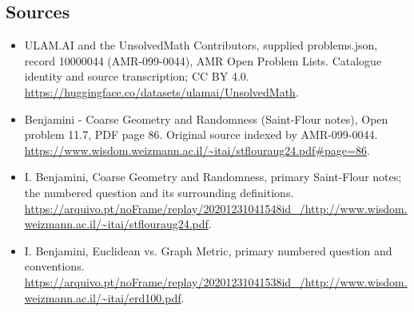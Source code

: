 \documentclass[11pt,a4paper]{article}
\begin{document}
\subsection{Sources}
\begin{itemize}
\item[S1] ULAM.AI and the UnsolvedMath Contributors, supplied problems.json, record 10000044 (AMR-099-0044), AMR Open Problem Lists. Catalogue identity and source transcription; CC BY 4.0.
\url{https://huggingface.co/datasets/ulamai/UnsolvedMath}.
\item[S2] Benjamini - Coarse Geometry and Randomness (Saint-Flour notes), Open problem 11.7, PDF page 86. Original source indexed by AMR-099-0044.
\url{https://www.wisdom.weizmann.ac.il/~itai/stflouraug24.pdf#page=86}.
\item[S3] I. Benjamini, Coarse Geometry and Randomness, primary Saint-Flour notes; the numbered question and its surrounding definitions.
\url{https://arquivo.pt/noFrame/replay/20201231041548id_/http://www.wisdom.weizmann.ac.il/~itai/stflouraug24.pdf}.
\item[S4] I. Benjamini, Euclidean vs. Graph Metric, primary numbered question and conventions.
\url{https://arquivo.pt/noFrame/replay/20201231041538id_/http://www.wisdom.weizmann.ac.il/~itai/erd100.pdf}.
\end{itemize}
\end{document}
